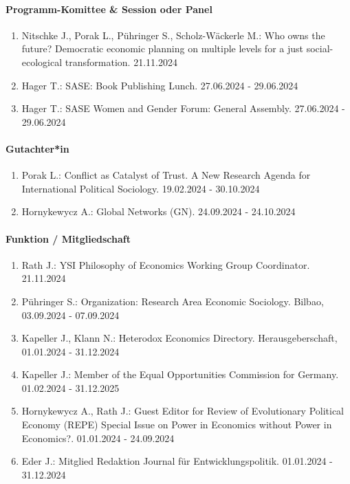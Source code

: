 \paragraph{Programm-Komittee \& Session oder Panel}
\begin{enumerate}[leftmargin=*, labelsep=0.5cm]
\item Nitschke J., Porak L., Pühringer S., Scholz-Wäckerle M.: Who owns the future? Democratic economic planning on multiple levels for a just social-ecological transformation. 21.11.2024
\item Hager T.: SASE: Book Publishing Lunch. 27.06.2024 - 29.06.2024
\item Hager T.: SASE Women and Gender Forum: General Assembly. 27.06.2024 - 29.06.2024
\end{enumerate}

\paragraph{Gutachter*in}
\begin{enumerate}[leftmargin=*, labelsep=0.5cm]
\item Porak L.: Conflict as Catalyst of Trust. A New Research Agenda for International Political Sociology. 19.02.2024 - 30.10.2024
\item Hornykewycz A.: Global Networks (GN). 24.09.2024 - 24.10.2024
\end{enumerate}

\paragraph{Funktion / Mitgliedschaft}
\begin{enumerate}[leftmargin=*, labelsep=0.5cm]
\item Rath J.: YSI Philosophy of Economics Working Group Coordinator. 21.11.2024
\item Pühringer S.: Organization: Research Area Economic Sociology. Bilbao, 03.09.2024 - 07.09.2024
\item Kapeller J., Klann N.: Heterodox Economics Directory. Herausgeberschaft, 01.01.2024 - 31.12.2024
\item Kapeller J.: Member of the Equal Opportunities Commission for Germany. 01.02.2024 - 31.12.2025
\item Hornykewycz A., Rath J.: Guest Editor for Review of Evolutionary Political Economy (REPE) Special Issue on \glqq Power in Economics without Power in Economics?\grqq{}. 01.01.2024 - 24.09.2024
\item Eder J.: Mitglied Redaktion Journal für Entwicklungspolitik. 01.01.2024 - 31.12.2024
\end{enumerate}
